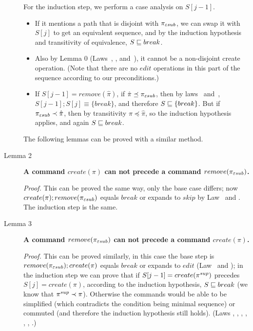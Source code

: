 \begin{description}
For the induction step, we perform a case analysis on \(S[j-1]\).
\begin{itemize}
\item
If it mentions a path that is disjoint with \(\pi_{\varepsilon sub}\),
we can swap it
with \(S[j]\) to get an equivalent sequence, and by the induction   
hypothesis and transitivity of equivalence, \(S\sqsubseteq break\).
\item
Also by Lemma 0 (Laws~\lawxvi, \lawxvii, and~\lawxxvii), it cannot be a
non-disjoint create operation. (Note that there are no \(edit\) operations
in this part of the sequence according to our preconditions.)
\item
If $S[j-1] =remove(\hat\pi)$, if $\hat\pi \preceq \pi_{\varepsilon sub}$, then by laws
\lawxxii~and~\lawxxiii, $S[j-1]; S[j] \equiv \{break\}$, and therefore 
$S\sqsubseteq\{break\}$.
But if $\pi_{\varepsilon sub} \prec \hat\pi$, then by transitivity $\pi \preceq
\hat\pi$, so the induction hypothesis applies, and again 
$S \sqsubseteq break$.
\end{itemize}

\begin{forrsi}
The following lemmas can be proved with a similar method.
\end{forrsi}
\item[Lemma 2]
{\bf A command \(create(\pi)\) can not precede a command  
\(remove(\pi_{\varepsilon sub})\).} 
\begin{notrsi}
\emph{Proof.} 
This can be proved the same way, only
the base case differs; now 
\(create(\pi); remove({\pi_{\varepsilon sub}})\) equals \(break\) or expands 
to \(skip\) by Law \lawxvi~and \lawxxvii.
The induction step is the same.
\end{notrsi}

\item[Lemma 3]
{\bf A command \(remove(\pi_{\varepsilon sub})\) can not precede a command
\(create(\pi)\).} 
\begin{notrsi}
\emph{Proof.} This can be proved similarly, in this 
case the base step is
\(remove(\pi_{\varepsilon sub}); create({\pi})\) equals \(break\) or
expands to \(edit\) (Law \lawxxi~and \lawxxviii);
in the induction step we can prove that if
\(S[j-1]=create(\pi^{sup})\) precedes \(S[j]=create(\pi)\), according to
the induction hypothesis, \(S\sqsubseteq break\) 
(we know that \(\pi^{sup}\prec\pi\)). Otherwise the commands
would be able to be simplified (which contradicts the condition being
minimal sequence) or commuted (and therefore the induction hypothesis
still holds). (Laws \lawvii,
\lawviii, \lawxiv, \lawxv, \lawxx, \lawxxi, \lawxxviii.)
\end{notrsi}


\end{description}
